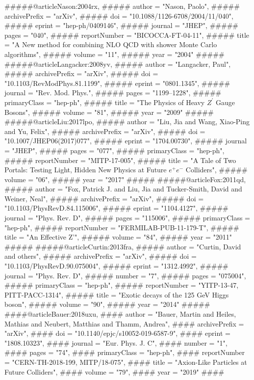 #####@article{Nason:2004rx,
#####    author = "Nason, Paolo",
#####    archivePrefix = "arXiv",
#####    doi = "10.1088/1126-6708/2004/11/040",
#####    eprint = "hep-ph/0409146",
#####    journal = "JHEP",
#####    pages = "040",
#####    reportNumber = "BICOCCA-FT-04-11",
#####    title = "{A New method for combining NLO QCD with shower Monte Carlo algorithms}",
#####    volume = "11",
#####    year = "2004"
#####}
#####@article{Langacker:2008yv,
#####    author = "Langacker, Paul",
#####    archivePrefix = "arXiv",
#####    doi = "10.1103/RevModPhys.81.1199",
#####    eprint = "0801.1345",
#####    journal = "Rev. Mod. Phys.",
#####    pages = "1199--1228",
#####    primaryClass = "hep-ph",
#####    title = "{The Physics of Heavy $Z^\prime$ Gauge Bosons}",
#####    volume = "81",
#####    year = "2009"
#####}
#####@article{Liu:2017lpo,
#####    author = "Liu, Jia and Wang, Xiao-Ping and Yu, Felix",
#####    archivePrefix = "arXiv",
#####    doi = "10.1007/JHEP06(2017)077",
#####    eprint = "1704.00730",
#####    journal = "JHEP",
#####    pages = "077",
#####    primaryClass = "hep-ph",
#####    reportNumber = "MITP-17-005",
#####    title = "{A Tale of Two Portals: Testing Light, Hidden New Physics at Future $e^+ e^-$ Colliders}",
#####    volume = "06",
#####    year = "2017"
#####}
#####@article{Fox:2011qd,
#####    author = "Fox, Patrick J. and Liu, Jia and Tucker-Smith, David and Weiner, Neal",
#####    archivePrefix = "arXiv",
#####    doi = "10.1103/PhysRevD.84.115006",
#####    eprint = "1104.4127",
#####    journal = "Phys. Rev. D",
#####    pages = "115006",
#####    primaryClass = "hep-ph",
#####    reportNumber = "FERMILAB-PUB-11-179-T",
#####    title = "{An Effective Z'}",
#####    volume = "84",
#####    year = "2011"
#####}
#####@article{Curtin:2013fra,
#####    author = "Curtin, David and others",
#####    archivePrefix = "arXiv",
#####    doi = "10.1103/PhysRevD.90.075004",
#####    eprint = "1312.4992",
#####    journal = "Phys. Rev. D",
#####    number = "7",
#####    pages = "075004",
#####    primaryClass = "hep-ph",
#####    reportNumber = "YITP-13-47, PITT-PACC-1314",
#####    title = "{Exotic decays of the 125 GeV Higgs boson}",
#####    volume = "90",
#####    year = "2014"
#####}
####@article{Bauer:2018uxu,
####    author = "Bauer, Martin and Heiles, Mathias and Neubert, Matthias and Thamm, Andrea",
####    archivePrefix = "arXiv",
####    doi = "10.1140/epjc/s10052-019-6587-9",
####    eprint = "1808.10323",
####    journal = "Eur. Phys. J. C",
####    number = "1",
####    pages = "74",
####    primaryClass = "hep-ph",
####    reportNumber = "CERN-TH-2018-199, MITP/18-075",
####    title = "{Axion-Like Particles at Future Colliders}",
####    volume = "79",
####    year = "2019"
####}
